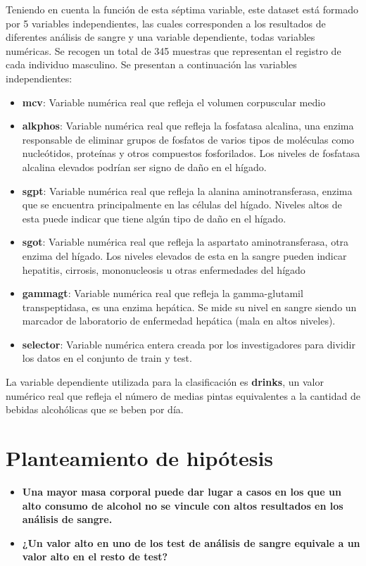 Teniendo en cuenta la función de esta séptima variable, este dataset está formado por 5 variables independientes, las cuales corresponden a los resultados de diferentes análisis de sangre y una variable dependiente, todas variables numéricas. Se recogen un total de 345 muestras que representan el registro de cada individuo masculino.
Se presentan a continuación las variables independientes:
\begin{itemize}
	\item \textbf{mcv}: Variable numérica real que refleja el volumen corpuscular medio
	
	\item \textbf{alkphos}: Variable numérica real que refleja la fosfatasa alcalina, una enzima responsable de eliminar grupos de fosfatos de varios tipos de moléculas como nucleótidos, proteínas y otros compuestos fosforilados. Los niveles de fosfatasa alcalina elevados podrían ser signo de daño en el hígado.
	
	\item \textbf{sgpt}: Variable numérica real que refleja la alanina aminotransferasa, enzima que se encuentra principalmente en las células del hígado. Niveles altos de esta puede indicar que tiene algún tipo de daño en el hígado. 
	
	\item \textbf{sgot}: Variable numérica real que refleja la aspartato aminotransferasa, otra enzima del hígado. Los niveles elevados de esta en la sangre pueden indicar hepatitis, cirrosis, mononucleosis u otras enfermedades del hígado
	
	\item \textbf{gammagt}: Variable numérica real que refleja la gamma-glutamil transpeptidasa, es una enzima hepática. Se mide su nivel en sangre siendo un marcador de laboratorio de enfermedad hepática (mala en altos niveles).
	
	\item \textbf{selector}: Variable numérica entera creada por los investigadores para dividir los datos en el conjunto de train y test. 
\end{itemize}

La variable dependiente utilizada para la clasificación es \textbf{drinks}, un valor numérico real que refleja el número de medias pintas equivalentes a la cantidad de bebidas alcohólicas que se beben por día. 


\vspace{1cm}
\section{Planteamiento de hipótesis}
\begin{itemize}
	\item \textbf{Una mayor masa corporal puede dar lugar a casos en los que un alto consumo de alcohol no se vincule con altos resultados en los análisis de sangre.}
	\item \textbf{¿Un valor alto en uno de los test de análisis de sangre equivale a un valor alto en el resto de test?}	
	
\end{itemize}




